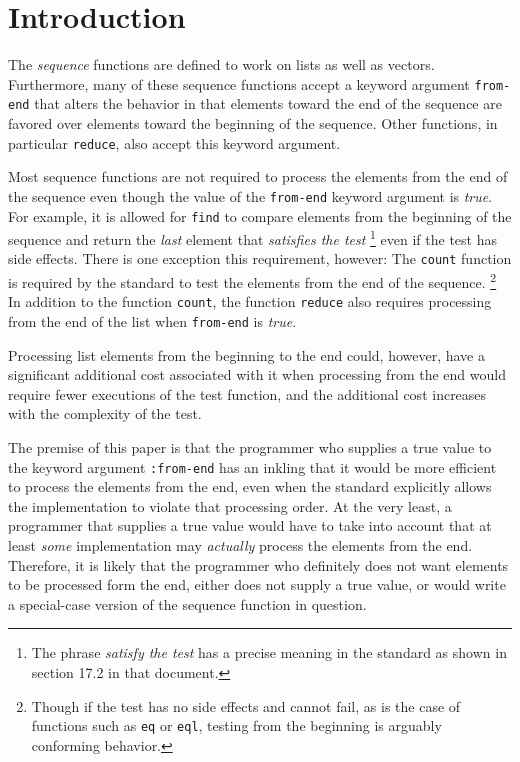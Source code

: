 \section{Introduction}

The \commonlisp{} \emph{sequence} functions are defined to work on
lists as well as vectors.  Furthermore, many of these sequence
functions accept a keyword argument \texttt{from-end} that alters the
behavior in that elements toward the end of the sequence are favored
over elements toward the beginning of the sequence.  Other functions,
in particular \texttt{reduce}, also accept this keyword argument.

Most sequence functions are not required to process the elements from
the end of the sequence even though the value of the \texttt{from-end}
keyword argument is \emph{true}.  For example, it is allowed for
\texttt{find} to compare elements from the beginning of the sequence
and return the \emph{last} element that \emph{satisfies the test}%
\footnote{The phrase \emph{satisfy the test} has a precise meaning in
  the \commonlisp{} standard as shown in section 17.2 in that
  document.}
even if the test has side effects.  There is one exception this
requirement, however:  The \texttt{count} function is required by the
standard to test the elements from the end of the sequence.%
\footnote{Though if the test has no side effects and cannot fail, as
  is the case of functions such as \texttt{eq} or \texttt{eql},
  testing from the beginning is arguably conforming behavior.}
In addition to the function \texttt{count}, the function
\texttt{reduce} also requires processing from the end of the list when
\texttt{from-end} is \emph{true}.

Processing list elements from the beginning to the end could, however,
have a significant additional cost associated with it when processing
from the end would require fewer executions of the test function, and
the additional cost increases with the complexity of the test.

The premise of this paper is that the programmer who supplies a true
value to the keyword argument \texttt{:from-end} has an inkling that
it would be more efficient to process the elements from the end, even
when the standard explicitly allows the implementation to violate that
processing order.  At the very least, a programmer that supplies a
true value would have to take into account that at least \emph{some}
implementation may \emph{actually} process the elements from the end.
Therefore, it is likely that the programmer who definitely does not
want elements to be processed form the end, either does not supply a
true value, or would write a special-case version of the sequence
function in question.

